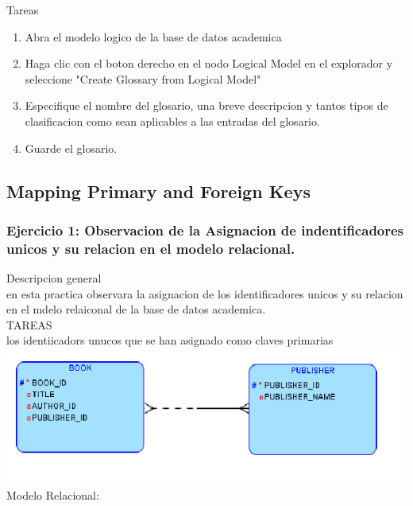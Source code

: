 \documentclass[12pt,letterpaper]{article}
\begin{document}
Tareas\\
\begin{enumerate}[1.]
    \item  Abra el modelo logico de la base de datos academica 
     
    \item Haga clic con el boton derecho en el nodo Logical Model en el explorador y seleccione "Create Glossary from Logical Model"
    
    \item Especifique el nombre del glosario, una breve descripcion y tantos tipos de clasificacion como sean aplicables a las entradas del glosario.
    
    \item Guarde el glosario.
    
		\end{enumerate}












 \newpage
\subsection{Mapping Primary and Foreign Keys}
\subsubsection{Ejercicio 1: Observacion de la Asignacion de indentificadores unicos y su relacion en el modelo relacional.} 
Descripcion general \\
en esta practica observara la asignacion de los identificadores unicos y su relacion en el mdelo relaiconal de la base de datos academica. \\
TAREAS\\
los identiicadors unucos que se han asignado como claves primarias\\
 \includegraphics[width=15cm]{./giselaImagen/imagen1.png} 
		\\ Modelo Relacional:
		
\end{document}
